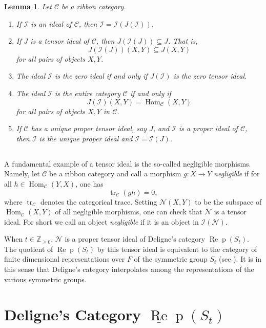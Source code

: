 \documentclass[12pt, reqno]{amsart}
\newtheorem{lemma}[theorem]{Lemma}
\theoremstyle{definition}
\newcommand{\Hom}{\operatorname{Hom}}
\def\uRep{\underline{\operatorname{Re}}\!\operatorname{p}}
\newcommand{\tr}{\text{tr}\,}
\renewcommand{\1}{_{(1)}}
\renewcommand{\2}{_{(2)}}
\newcommand{\3}{_{(3)}}
\newcommand{\4}{_{(4)}}
\newcommand{\mN}{{\mathcal N}}
\newcommand{\Z}{\mathbb{Z}}
\newcommand{\cat}{\mathcal{C}}
\newcommand{\ideal}{\mathcal{I}}
\renewcommand{\tr}{\operatorname{tr}}
\begin{document}
\begin{lemma}\label{L:ideals}  Let $\cat$ be a ribbon category.
\begin{enumerate}
\item If $\ideal$ is an ideal of $\cat$, then $\ideal = \ideal(J(\ideal))$.
\item If $J$ is a tensor ideal of $\cat$, then $J(\ideal(J)) \subseteq J$.  That is, 
\[
 J(\ideal(J))(X,Y) \subseteq J(X,Y) 
\]
for all pairs of objects $X,Y$.
\item The ideal $\ideal$ is the zero ideal if and only if $J(\ideal )$ is the zero tensor ideal.
\item The ideal $\ideal$ is the entire category $\cat$ if and only if 
\[
J(\ideal)(X,Y)=\Hom_{\cat}(X,Y)
\]
for all pairs of objects $X,Y$ in $\cat$. 
\item If $\cat$ has a unique proper tensor ideal, say $J$, and $\ideal$ is a proper ideal of $\cat$, then $\ideal$ is the unique proper ideal and $\ideal = \ideal (J)$.
\end{enumerate}
\end{lemma}  


\subsection{} A fundamental example of a tensor ideal is the so-called negligible morphisms.  Namely, let $\cat$ be a ribbon category and call a morphism $g: X \to Y$ \emph{negligible} if for all $h \in \Hom_{\cat}(Y,X)$, one has 
\[
\tr_{\cat}(gh) =0,
\] where $\tr_{\cat}$ denotes the categorical trace.  Setting $\mN(X,Y)$ to be the subspace of $\Hom_{\cat}(X,Y)$ of all negligible morphisms, one can check that $\mN$ is a tensor ideal. For short we call an object \emph{negligible} if it is an object in $\ideal (\mN )$.

When $t \in \Z_{\geq 0}$, $\mN$ is a proper tensor ideal of Deligne's category $\uRep(S_{t})$.  The quotient of $\uRep (S_{t})$ by this tensor ideal is equivalent to the category of finite dimensional representations over $F$ of the symmetric group $S_{t}$ (see \cite[Theorem 3.24]{CO1}).  It is in this sense that Deligne's category interpolates among the representations of the various symmetric groups.



\section{Deligne's Category $\uRep(S_t)$ }\label{}
\end{document}
